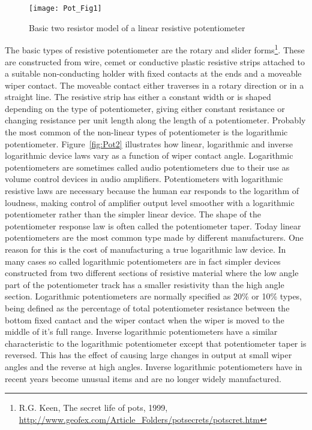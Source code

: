 \begin{figure} [here]
  \centering
  \texttt{[image: Pot\_Fig1]}
  \caption{Basic two resistor model of a linear resistive potentiometer}
  \label{fig:Pot1}
\end{figure} 

The basic types of resistive potentiometer are the rotary and slider
forms\footnote{R.G. Keen, The secret life of pots, 1999,
\url{http://www.geofex.com/Article_Folders/potsecrets/potscret.htm}
}. These are constructed from wire, cemet or conductive plastic
resistive strips attached to a suitable non-conducting holder with
fixed contacts at the ends and a moveable wiper contact. The moveable
contact either traverses in a rotary direction or in a straight
line. The resistive strip has either a constant width or is shaped
depending on the type of potentiometer, giving either constant
resistance or changing resistance per unit length along the length of
a potentiometer. Probably the most common of the non-linear types of
potentiometer is the logarithmic potentiometer. Figure~\ref{fig:Pot2}
illustrates how linear, logarithmic and inverse logarithmic device
laws vary as a function of wiper contact angle. Logarithmic
potentiometers are sometimes called audio potentiometers due to their
use as volume control devices in audio amplifiers. Potentiometers with
logarithmic resistive laws are necessary because the human ear
responds to the logarithm of loudness, making control of amplifier
output level smoother with a logarithmic potentiometer rather than the
simpler linear device. The shape of the potentiometer response law is
often called the potentiometer taper. Today linear potentiometers are
the most common type made by different manufacturers. One reason for
this is the cost of manufacturing a true logarithmic law device. In
many cases so called logarithmic potentiometers are in fact simpler
devices constructed from two different sections of resistive material
where the low angle part of the potentiometer track has a smaller
resistivity than the high angle section. Logarithmic potentiometers
are normally specified as 20\% or 10\% types, being defined as the
percentage of total potentiometer resistance between the bottom fixed
cantact and the wiper contact when the wiper is moved to the middle of
it's full range. Inverse logarithmic potentiometers have a similar
characteristic to the logarithmic potentiometer except that
potentiometer taper is reversed. This has the effect of causing large
changes in output at small wiper angles and the reverse at high
angles. Inverse logarithmic potentiometers have in recent years become
unusual items and are no longer widely manufactured.


